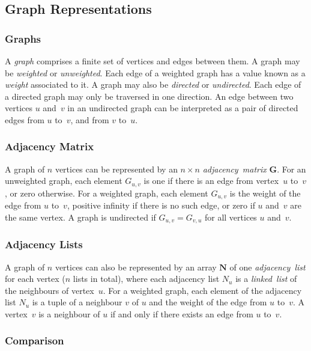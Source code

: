 \subsection{Graph Representations}
\subsubsection{Graphs}

A \emph{graph} comprises a finite set of vertices and edges between them.
A graph may be \emph{weighted} or \emph{unweighted}.
Each edge of a weighted graph has a value known as a \emph{weight} associated to it.
A graph may also be \emph{directed} or \emph{undirected}.
Each edge of a directed graph may only be traversed in one direction.
An edge between two vertices \( u \) and~\( v \) in an undirected graph can be interpreted as a pair of directed edges from \( u \) to~\( v \), and from \( v \) to~\( u \).

\subsubsection{Adjacency Matrix}

A graph of \( n \) vertices can be represented by an \( n \times n \) \emph{adjacency~matrix} \( \mathbf{G} \).
For an unweighted graph, each element \( G_{u,v} \) is one if there is an edge from vertex~\( u \) to~\( v \), or zero otherwise.
For a weighted graph, each element \( G_{u,v} \) is the weight of the edge from \( u \) to~\( v \), positive infinity if there is no such edge, or zero if \( u \) and~\( v \) are the same vertex.
A graph is undirected if \( G_{u,v} = G_{v,u} \) for all vertices \( u \) and~\( v \).

\subsubsection{Adjacency Lists}

A graph of \( n \) vertices can also be represented by an array \( \boldsymbol{N} \) of one \emph{adjacency~list} for each vertex (\( n \) lists in total), where each adjacency list \( N_{u} \) is a \emph{linked~list} of the neighbours of vertex~\( u \).
For a weighted graph, each element of the adjacency list \( N_{u} \) is a tuple of a neighbour \( v \) of \( u \) and the weight of the edge from \( u \) to~\( v \).
A vertex~\( v \) is a neighbour of \( u \) if and only if there exists an edge from \( u \) to~\( v \).

\subsubsection{Comparison}

